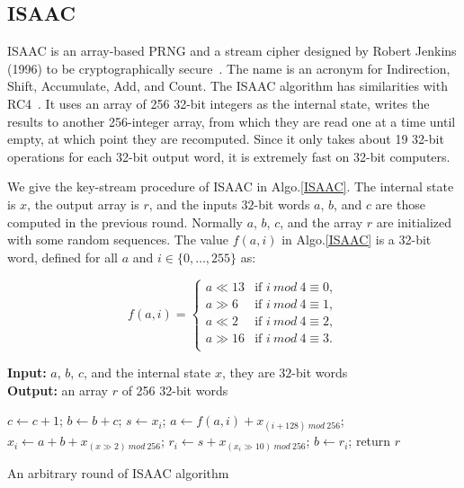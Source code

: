 \subsection{ISAAC}
ISAAC is an array-based PRNG and a stream cipher designed by Robert Jenkins (1996) to be cryptographically secure~\cite{Jenkins1996}. The name is an acronym for Indirection, Shift, Accumulate, Add, and Count. The ISAAC algorithm has similarities with RC4~\cite{citeulike:3805944}. It uses an array of 256 32-bit integers as the internal state, writes the results to another 256-integer array, from which they are read one at a time until empty, at which point they are recomputed. Since it only takes about 19 32-bit operations for each 32-bit output word, it is extremely fast on 32-bit computers.

We give the key-stream procedure of ISAAC in Algo.\ref{ISAAC}. The internal state is $x$, the output array is $r$, and the inputs $32$-bit words $a$, $b$, and $c$ are those computed in the previous round. Normally $a$, $b$, $c$, and the array $r$ are initialized with some random sequences.%
The value $f(a,i)$ in Algo.\ref{ISAAC} is a 32-bit word, defined for all $a$ and $i\in\{0,\dots,255\}$ as:

\begin{equation}
f(a,i) = \left\{\begin{array}{ll}
a\ll13 & \text{if } i~mod~4\equiv0 , \\
a\gg6 & \text{if } i~mod~4\equiv1 , \\
a\ll2 & \text{if } i~mod~4\equiv2, \\
a\gg16 & \text{if } i~mod~4\equiv3. \\
\end{array}
\right.
\end{equation}

\begin{algorithm}
\textbf{Input:} $a$, $b$, $c$, and the internal state $x$, they are $32$-bit words\\
\textbf{Output:} an array $r$ of 256 32-bit words
\begin{algorithmic}[1]
\STATE$c\leftarrow{c+1}$;
\STATE$b\leftarrow{b+c}$;
\STATE$s\leftarrow{x_i}$;
\STATE$a\leftarrow{f(a,i)+x_{(i+128)~mod~256}}$;
\STATE$x_i\leftarrow{a+b+x_{(x\gg2)~mod~256}}$;
\STATE$r_i\leftarrow{s+x_{(x_i\gg10)~mod~256}}$;
\STATE$b\leftarrow{r_i}$;
\ENDWHILE
\STATE return $r$\;
\medskip
\caption{An arbitrary round of ISAAC algorithm}
\label{ISAAC}
\end{algorithmic}
\end{algorithm}





